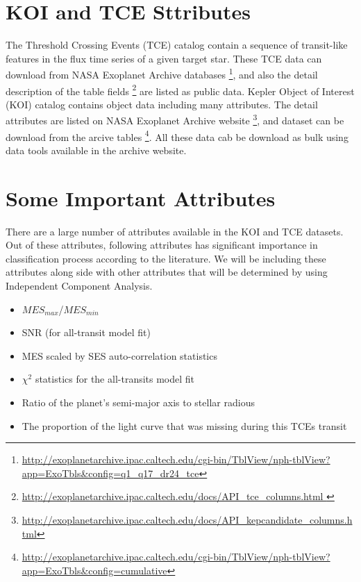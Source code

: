 \section{KOI and TCE Sttributes }

The Threshold Crossing Events (TCE) catalog contain a sequence of transit-like features in the flux time series of a given target star. These TCE data can download from NASA Exoplanet Archive databases \footnote{\url{http://exoplanetarchive.ipac.caltech.edu/cgi-bin/TblView/nph-tblView?app=ExoTbls&config=q1_q17_dr24_tce}}, and also the detail description of the table fields \footnote{\url{http://exoplanetarchive.ipac.caltech.edu/docs/API_tce_columns.html }} are listed as public data. Kepler Object of Interest (KOI) catalog contains object data including many attributes. The detail attributes are listed on NASA Exoplanet Archive website \footnote{\url{
http://exoplanetarchive.ipac.caltech.edu/docs/API_kepcandidate_columns.html}}, and dataset can be download from the arcive tables \footnote{\url{http://exoplanetarchive.ipac.caltech.edu/cgi-bin/TblView/nph-tblView?app=ExoTbls&config=cumulative}}. All these data cab be download as bulk using data tools available in the archive website.

\section{Some Important Attributes}
\label{label:important_attributes}
There are a large number of attributes available in the KOI and TCE datasets. Out of these attributes, following attributes has significant importance in classification process according to the literature. We will be including these attributes along side with other attributes that will be determined by using Independent Component Analysis.

\begin{itemize}
	\item $MES_{max}$/$MES_{min}$
	\item SNR (for all-transit model fit)
	\item MES scaled by SES auto-correlation statistics
	\item $\chi^{2}$ statistics for the all-transits model fit
	\item Ratio of the planet's semi-major axis to stellar radious
	\item The proportion of the light curve that was missing during this TCEs transit
\end{itemize}

